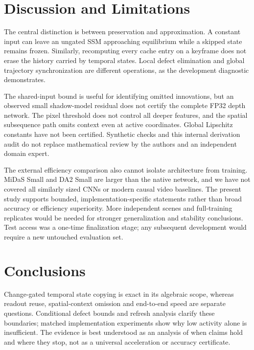 \documentclass[mathematics,article,submit,moreauthors]{Definitions/mdpi}
\begin{document}
\section{Discussion and Limitations}
The central distinction is between preservation and approximation. A constant input can
leave an ungated SSM approaching equilibrium while a skipped state remains frozen.
Similarly, recomputing every cache entry on a keyframe does not erase the history carried
by temporal states. Local defect elimination and global trajectory synchronization
are different operations, as the development diagnostic demonstrates.

The shared-input bound is useful for identifying omitted innovations, but an observed
small shadow-model residual does not certify the complete FP32 depth network. The
pixel threshold does not control all deeper features, and the spatial subsequence path
omits context even at active coordinates. Global Lipschitz constants have not been
certified. Synthetic checks and this internal derivation audit do not replace mathematical
review by the authors and an independent domain expert.

The external efficiency comparison also cannot isolate architecture from training.
MiDaS Small and DA2 Small are larger than the native network, and we have not covered
all similarly sized CNNs or modern causal video baselines. The present study supports
bounded, implementation-specific statements rather than broad accuracy or efficiency
superiority. More independent scenes and full-training replicates would be needed for
stronger generalization and stability conclusions. Test access was a one-time finalization
stage; any subsequent development would require a new untouched evaluation set.

\section{Conclusions}
Change-gated temporal state copying is exact in its algebraic scope, whereas readout
reuse, spatial-context omission and end-to-end speed are separate questions. Conditional
defect bounds and refresh analysis clarify these boundaries; matched implementation
experiments show why low activity alone is insufficient. The evidence is best understood
as an analysis of when claims hold and where they stop, not as a universal acceleration
or accuracy certificate.
\end{document}
